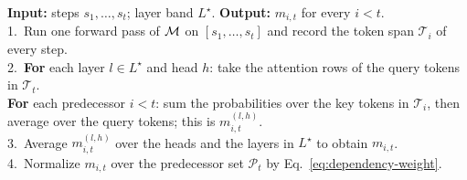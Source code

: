 \begin{methodbox}
\footnotesize
\textbf{Input:} steps $s_1,\ldots,s_t$; layer band $L^\star$. \quad
\textbf{Output:} $m_{i,t}$ for every $i<t$.\\[2pt]
    1.\ Run one forward pass of $\mathcal{M}$ on $[s_1,\ldots,s_t]$ and record the token span $\mathcal{T}_i$ of every step.\\
    2.\ \textbf{For} each layer $l\in L^\star$ and head $h$: take the attention rows of the query tokens in $\mathcal{T}_t$.\\
        \hspace*{1.4em}\textbf{For} each predecessor $i<t$: sum the probabilities over the key tokens in $\mathcal{T}_i$, then average over the query tokens; this is $m^{(l,h)}_{i,t}$.\\
    3.\ Average $m^{(l,h)}_{i,t}$ over the heads and the layers in $L^\star$ to obtain $m_{i,t}$.\\
    4.\ Normalize $m_{i,t}$ over the predecessor set $\mathcal{P}_t$ by Eq.~\ref{eq:dependency-weight}.
\end{methodbox}




